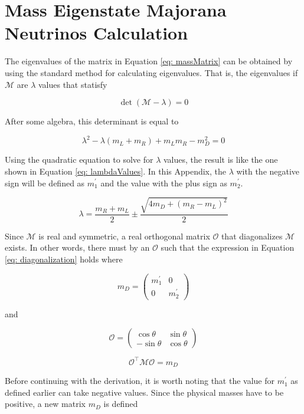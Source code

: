 \chapter{Mass Eigenstate Majorana Neutrinos Calculation}\label{chapter: massEigenstates}

The eigenvalues of the matrix in Equation \ref{eq: massMatrix} can be obtained by using the standard method for calculating eigenvalues. That is, the eigenvalues if $\mathcal{M}$ are $\lambda$ values that statisfy

$$\det \left(\mathcal{M} - \lambda\right) = 0$$

After some algebra, this determinant is equal to 

$$\lambda^{2} -\lambda\left(m_{L} + m_{R}\right) + m_{L}m_{R} -m_{D}^{2} = 0$$

Using the quadratic equation to solve for $\lambda$ values, the result is like the one shown in Equation \ref{eq: lambdaValues}. In this Appendix, the $\lambda$ with the negative sign will be defined as $m_{1}^{\prime}$ and the value with the plus sign as $m_{2}^{\prime}$.

\begin{equation}\label{eq: lambdaValues}
 \lambda = \frac{m_{R} + m_{L}}{2} \pm \frac{\sqrt{4m_{D} + \left(m_{R} - m_{L}\right)^{2}}}{2}
\end{equation}

Since $\mathcal{M}$ is real and symmetric, a real orthogonal matrix $\mathcal{O}$ that diagonalizes $\mathcal{M}$ exists. In other words, there must by an $\mathcal{O}$ such that the expression in Equation \ref{eq: diagonalization} holds where 

$$m_{D} = \begin{pmatrix} m_{1}^{\prime} & 0 \\ 0 & m_{2}^{\prime} \end{pmatrix}$$

and 

$$ \mathcal{O} = \begin{pmatrix} \cos \theta & \sin \theta \\ -\sin \theta & \cos \theta \end{pmatrix}$$

\begin{equation}\label{eq: diagonalization}
\mathcal{O}^{\intercal}\mathcal{MO} = m_{D} 
\end{equation}
           
Before continuing with the derivation, it is worth noting that the value for $m_{1}^{\prime}$ as defined earlier can take negative values. Since the physical masses have to be positive, a new matrix $m_{D}$ is defined

